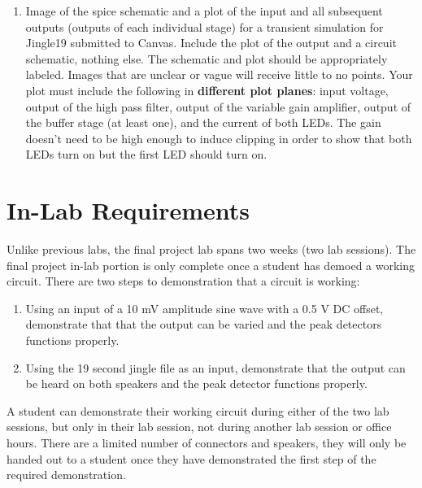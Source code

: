 \begin{enumerate}
	\item Image of the spice schematic and a plot of the input and all subsequent outputs (outputs of each individual stage) for a transient simulation for Jingle19 submitted to Canvas. Include the plot of the output and a circuit schematic, nothing else. The schematic and plot should be appropriately labeled. Images that are unclear or vague will receive little to no points. Your plot must include the following in \textbf{different plot planes}: input voltage, output of the high pass filter, output of the variable gain amplifier, output of the buffer stage (at least one), and the current of both LEDs. The gain doesn't need to be high enough to induce clipping in order to show that both LEDs turn on but the first LED should turn on. 
\end{enumerate}

\section{In-Lab Requirements}

Unlike previous labs, the final project lab spans two weeks (two lab sessions). The final project in-lab portion is only complete once a student has demoed a working circuit. There are two steps to demonstration that a circuit is working:

\begin{enumerate}
	\item Using an input of a 10 mV amplitude sine wave with a 0.5 V DC offset, demonstrate that that the output can be varied and the peak detectors functions properly.
	\item Using the 19 second jingle file as an input, demonstrate that the output can be heard on both speakers and the peak detector functions properly. 
\end{enumerate}

A student can demonstrate their working circuit during either of the two lab sessions, but only in their lab session, not during another lab session or office hours. There are a limited number of connectors and speakers, they will only be handed out to a student once they have demonstrated the first step of the required demonstration.

